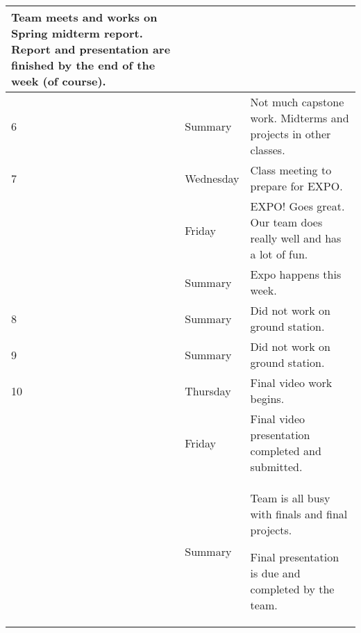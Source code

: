 \begin{longtable}{ | l | l | p{14cm} | }
Team meets and works on Spring midterm report. Report and presentation are finished by the end of the week (of course). 
\\
\hline
6 & Summary & Not much capstone work. Midterms and projects in other classes. \\
\hline
7 & Wednesday & Class meeting to prepare for EXPO. \\
 & Friday & EXPO! Goes great. Our team does really well and has a lot of fun. \\
\cline{2-3}
 & Summary & Expo happens this week. \\
\hline
8 & Summary & Did not work on ground station. \\
\hline
9 & Summary & Did not work on ground station. \\
\hline
10 & Thursday & Final video work begins. \\
 & Friday & Final video presentation completed and submitted. \\
 \cline{2-3}
 & Summary & Team is all busy with finals and final projects. 

Final presentation is due and completed by the team.\\
\hline
\end{longtable}